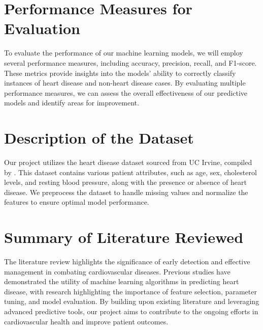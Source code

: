 \section{Performance Measures for Evaluation}
To evaluate the performance of our machine learning models, we will employ several performance measures, including accuracy, precision, recall, and F1-score. These metrics provide insights into the models' ability to correctly classify instances of heart disease and non-heart disease cases. By evaluating multiple performance measures, we can assess the overall effectiveness of our predictive models and identify areas for improvement.

\section{Description of the Dataset}
Our project utilizes the heart disease dataset sourced from UC Irvine, compiled by \cite{janosi-1988}. This dataset contains various patient attributes, such as age, sex, cholesterol levels, and resting blood pressure, along with the presence or absence of heart disease. We preprocess the dataset to handle missing values and normalize the features to ensure optimal model performance.

\section{Summary of Literature Reviewed}
The literature review highlights the significance of early detection and effective management in combating cardiovascular diseases. Previous studies have demonstrated the utility of machine learning algorithms in predicting heart disease, with research highlighting the importance of feature selection, parameter tuning, and model evaluation. By building upon existing literature and leveraging advanced predictive tools, our project aims to contribute to the ongoing efforts in cardiovascular health and improve patient outcomes.